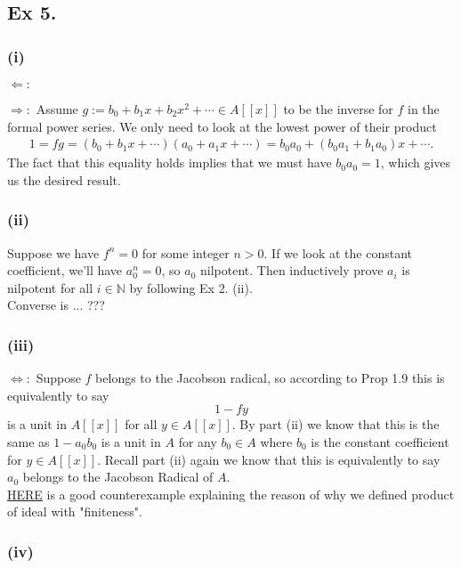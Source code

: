 \subsection{Ex 5.} 

\subsubsection{(i)} 

$\Leftarrow:$ 

\noindent $\Rightarrow:$ Assume $g:=b_0+b_1x+b_2x^2+\cdots\in A[[x]]$ to be the inverse for $f$ in the formal power series.
We only need to look at the lowest power of their product
\begin{align*}
    1=fg=(b_0+b_1x+\cdots)(a_0+a_1x+\cdots)=b_0a_0+(b_0a_1+b_1a_0)x+\cdots.
\end{align*}The fact that this equality holds implies that we must have $b_0a_0=1$, which gives us the desired result.

\subsubsection{(ii)} Suppose we have $f^n=0$ for some integer $n>0$. If we look at the constant coefficient, we'll have $a_0^n=0$, so $a_0$ nilpotent. Then inductively prove $a_i$ is nilpotent for all $i\in \mathbb N$ by following Ex 2. (ii).\\

Converse is ... ???

\subsubsection{(iii)} 

$\Leftrightarrow:$ Suppose $f$ belongs to the Jacobson radical, so according to Prop 1.9 this is equivalently to say
$$1-fy$$ is a unit in $A[[x]]$ for all $y\in A[[x]]$. By part (ii) we know that this is the same as $1-a_0b_0$ is a unit in $A$ for any $b_0\in A$ where $b_0$ is the constant coefficient for $y\in A[[x]]$. Recall part (ii) again we know that this is equivalently to say $a_0$ belongs to the Jacobson Radical of $A$.\\

\href{https://math.stackexchange.com/questions/367073/about-the-definition-of-extended-ideals}{HERE} is a good counterexample explaining the reason of why we defined product of ideal with "finiteness".

\subsubsection{(iv)}

